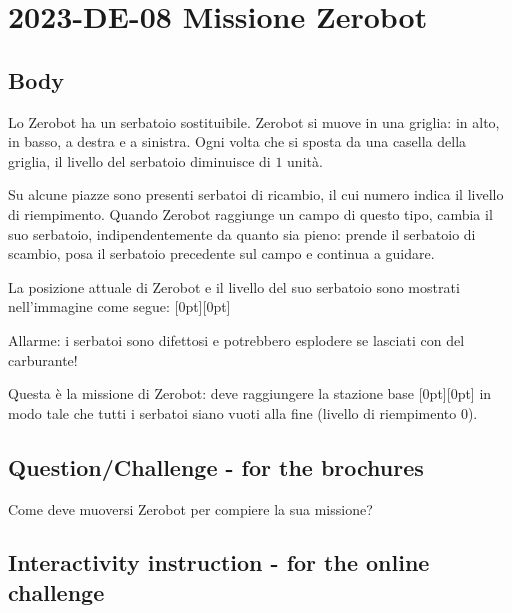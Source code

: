 \documentclass[a4paper,11pt]{report}
\newcommand{\taskGraphicsFolder}{..}
\begin{document}
\section*{\centering{} 2023-DE-08 Missione Zerobot}


\subsection*{Body}

Lo Zerobot ha un serbatoio sostituibile.
Zerobot si muove in una griglia: in alto, in basso, a destra e a sinistra.
Ogni volta che si sposta da una casella della griglia, il livello del serbatoio diminuisce di $1$ unità.

Su alcune piazze sono presenti serbatoi di ricambio, il cui numero indica il livello di riempimento.
Quando Zerobot raggiunge un campo di questo tipo, cambia il suo serbatoio, indipendentemente da quanto sia pieno: prende il serbatoio di scambio, posa il serbatoio precedente sul campo e continua a guidare.

La posizione attuale di Zerobot e il livello del suo serbatoio sono mostrati nell’immagine come segue: \raisebox{-0.5ex}[0pt][0pt]{}

{\centering%
\par}

Allarme: i serbatoi sono difettosi e potrebbero esplodere se lasciati con del carburante!

Questa è la missione di Zerobot: deve raggiungere la stazione base \raisebox{-0.5ex}[0pt][0pt]{} in modo tale che tutti i serbatoi siano vuoti alla fine (livello di riempimento $0$).

{\em


\subsection*{Question/Challenge - for the brochures}

Come deve muoversi Zerobot per compiere la sua missione?

}


\subsection*{Interactivity instruction - for the online challenge}
\end{document}
